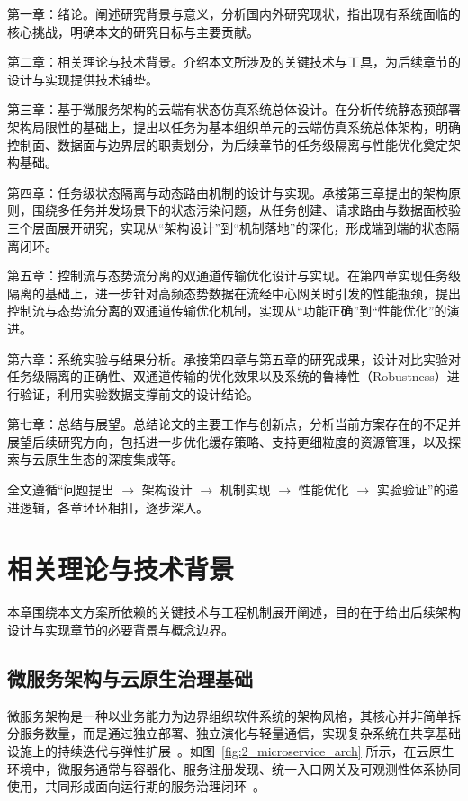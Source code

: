 \documentclass[lang=chs, degree=master, blindreview=true, winfonts=true, academic=false]{yanputhesis}
\begin{document}
第一章：绪论。阐述研究背景与意义，分析国内外研究现状，指出现有系统面临的核心挑战，明确本文的研究目标与主要贡献。

第二章：相关理论与技术背景。介绍本文所涉及的关键技术与工具，为后续章节的设计与实现提供技术铺垫。

第三章：基于微服务架构的云端有状态仿真系统总体设计。在分析传统静态预部署架构局限性的基础上，提出以任务为基本组织单元的云端仿真系统总体架构，明确控制面、数据面与边界层的职责划分，为后续章节的任务级隔离与性能优化奠定架构基础。

第四章：任务级状态隔离与动态路由机制的设计与实现。承接第三章提出的架构原则，围绕多任务并发场景下的状态污染问题，从任务创建、请求路由与数据面校验三个层面展开研究，实现从“架构设计”到“机制落地”的深化，形成端到端的状态隔离闭环。

第五章：控制流与态势流分离的双通道传输优化设计与实现。在第四章实现任务级隔离的基础上，进一步针对高频态势数据在流经中心网关时引发的性能瓶颈，提出控制流与态势流分离的双通道传输优化机制，实现从“功能正确”到“性能优化”的演进。

第六章：系统实验与结果分析。承接第四章与第五章的研究成果，设计对比实验对任务级隔离的正确性、双通道传输的优化效果以及系统的鲁棒性（Robustness）进行验证，利用实验数据支撑前文的设计结论。

第七章：总结与展望。总结论文的主要工作与创新点，分析当前方案存在的不足并展望后续研究方向，包括进一步优化缓存策略、支持更细粒度的资源管理，以及探索与云原生生态的深度集成等。

全文遵循“问题提出 $\rightarrow$ 架构设计 $\rightarrow$ 机制实现 $\rightarrow$ 性能优化 $\rightarrow$ 实验验证”的递进逻辑，各章环环相扣，逐步深入。


\cleardoublepage





\chapter{相关理论与技术背景}

本章围绕本文方案所依赖的关键技术与工程机制展开阐述，目的在于给出后续架构设计与实现章节的必要背景与概念边界。

\section{微服务架构与云原生治理基础}

微服务架构是一种以业务能力为边界组织软件系统的架构风格，其核心并非简单拆分服务数量，而是通过独立部署、独立演化与轻量通信，实现复杂系统在共享基础设施上的持续迭代与弹性扩展~\cite{KARABEYAKSAKALLI2021111014,DIFRANCESCO201977}。如图~\ref{fig:2_microservice_arch} 所示，在云原生环境中，微服务通常与容器化、服务注册发现、统一入口网关及可观测性体系协同使用，共同形成面向运行期的服务治理闭环~\cite{7030212,11222805,10220070,9929766}。
\end{document}
